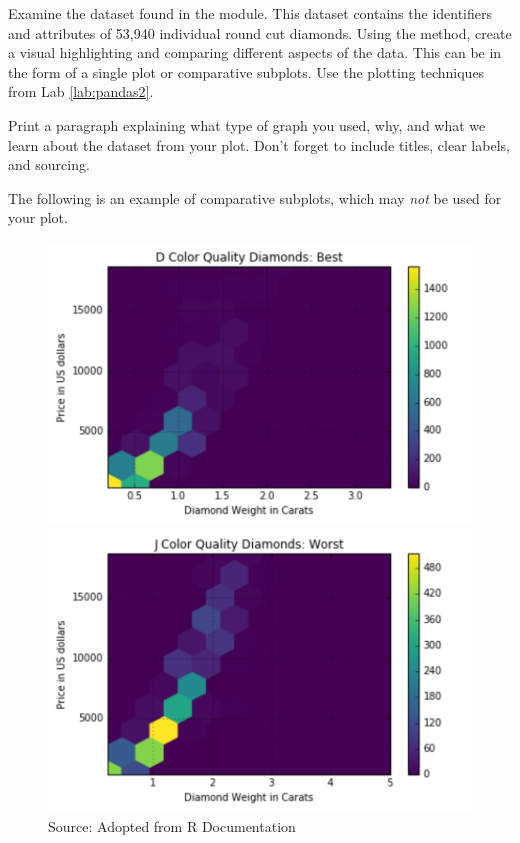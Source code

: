 \begin{problem} 
Examine the  dataset found in the  module. 
This dataset contains the identifiers and attributes of 53,940  individual round cut diamonds. 
Using the  method, create a visual highlighting and comparing different aspects of the data.
This can be in the form of a single plot or comparative subplots.  Use the plotting techniques from Lab \ref{lab:pandas2}.

Print a paragraph explaining what type of graph you used, why, and what we learn about the dataset from your plot.
Don't forget to include titles, clear labels, and sourcing. 

The following is an example of comparative subplots, which may \emph{not} be used for your plot.
\begin{figure}[H] %
    \centering
    \begin{minipage}[b]{0.48\textwidth}
    \includegraphics[width=\textwidth]{DiamondD.pdf}
    \end{minipage}
    \quad
    \begin{minipage}[b]{0.48\textwidth}
    \includegraphics[width=\textwidth]{DiamondJ.pdf}
    \end{minipage}
    \caption{Source: Adopted from R Documentation}
    \label{fig:intro2}
\end{figure}


\end{problem}
